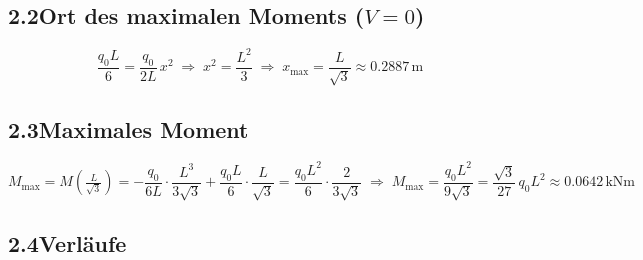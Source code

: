 \documentclass[a4paper,11pt]{article}
\begin{document}
\subsection*{2.2\quad Ort des maximalen Moments ($V = 0$)}

\[
  \frac{q_0 L}{6} = \frac{q_0}{2L}\,x^2
  \;\Rightarrow\; x^2 = \frac{L^2}{3}
  \;\Rightarrow\; \boxed{x_{\max} = \frac{L}{\sqrt{3}} \approx 0.2887\,\text{m}}
\]

\subsection*{2.3\quad Maximales Moment}

\[
  M_{\max} = M\!\left(\tfrac{L}{\sqrt{3}}\right)
  = -\frac{q_0}{6L}\cdot\frac{L^3}{3\sqrt{3}} + \frac{q_0 L}{6}\cdot\frac{L}{\sqrt{3}}
  = \frac{q_0 L^2}{6}\cdot\frac{2}{3\sqrt{3}}
  \;\Rightarrow\;
  \boxed{M_{\max} = \frac{q_0 L^2}{9\sqrt{3}}
         = \frac{\sqrt{3}}{27}\,q_0 L^2 \approx 0.0642\,\text{kNm}}
\]

\subsection*{2.4\quad Verläufe}
\end{document}

